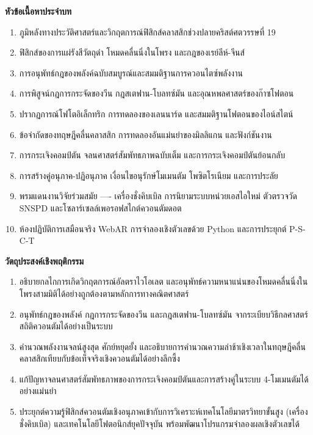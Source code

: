\begin{lessonplanbox}
\noindent\textbf{หัวข้อเนื้อหาประจำบท}
\begin{enumerate}
    \item ภูมิหลังทางประวัติศาสตร์และวิกฤตการณ์ฟิสิกส์คลาสสิกช่วงปลายคริสต์ศตวรรษที่ 19
    \item ฟิสิกส์ของการแผ่รังสีวัตถุดำ โหมดคลื่นนิ่งในโพรง และกฎของเรย์ลีห์-จีนส์
    \item การอนุพัทธ์กฎของพลังค์ฉบับสมบูรณ์และสมมติฐานการควอนไตซ์พลังงาน
    \item การพิสูจน์กฎการกระจัดของวีน กฎสเตฟาน-โบลทซ์มัน และอุณหพลศาสตร์ของก๊าซโฟตอน
    \item ปรากฏการณ์โฟโตอิเล็กทริก การทดลองของเลนนาร์ด และสมมติฐานโฟตอนของไอน์สไตน์
    \item ข้อจำกัดของทฤษฎีคลื่นคลาสสิก การทดลองอันแม่นยำของมิลลิแกน และฟังก์ชันงาน
    \item การกระเจิงคอมป์ตัน จลนศาสตร์สัมพัทธภาพฉบับเต็ม และการกระเจิงคอมป์ตันย้อนกลับ
    \item การสร้างคู่อนุภาค-ปฏิอนุภาค เงื่อนไขอนุรักษ์โมเมนตัม โพซิตโรเนียม และการประลัย
    \item พรมแดนงานวิจัยร่วมสมัย ---- เครื่องชั่งคิบเบิล การนิยามระบบหน่วยเอสไอใหม่ ตัวตรวจวัด SNSPD และโซลาร์เซลล์เพอรอฟสไกต์ควอนตัมดอต
    \item ห้องปฏิบัติการเสมือนจริง WebAR การจำลองเชิงตัวเลขด้วย Python และการประยุกต์ P-S-C-T
\end{enumerate}

\noindent\textbf{วัตถุประสงค์เชิงพฤติกรรม}
\begin{enumerate}
    \item อธิบายกลไกการเกิดวิกฤตการณ์อัลตราไวโอเลต และอนุพัทธ์ความหนาแน่นของโหมดคลื่นนิ่งในโพรงสามมิติได้อย่างถูกต้องตามหลักการทางคณิตศาสตร์
    \item อนุพัทธ์กฎของพลังค์ กฎการกระจัดของวีน และกฎสเตฟาน-โบลทซ์มัน จากระเบียบวิธีกลศาสตร์สถิติควอนตัมได้อย่างเป็นระบบ
    \item คำนวณพลังงานจลน์สูงสุด ศักย์หยุดยั้ง และอธิบายการคำนวณความล่าช้าเชิงเวลาในทฤษฎีคลื่นคลาสสิกเทียบกับข้อเท็จจริงเชิงควอนตัมได้อย่างลึกซึ้ง
    \item แก้ปัญหาจลนศาสตร์สัมพัทธภาพของการกระเจิงคอมป์ตันและการสร้างคู่ในระบบ 4-โมเมนตัมได้อย่างแม่นยำ
    \item ประยุกต์ความรู้ฟิสิกส์ควอนตัมเชิงอนุภาคเข้ากับการวิเคราะห์เทคโนโลยีมาตรวิทยาขั้นสูง (เครื่องชั่งคิบเบิล) และเทคโนโลยีโฟตอนิกส์ยุคปัจจุบัน พร้อมพัฒนาโปรแกรมจำลองผลเชิงตัวเลขได้
\end{enumerate}
\end{lessonplanbox}

